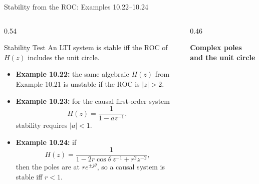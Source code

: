\begin{frame}[t]{Stability from the ROC: Examples 10.22--10.24}
  \footnotesize
  \begin{columns}[T]
    \begin{column}{0.54\textwidth}
      \begin{conceptbox}{Stability Test}
        An LTI system is stable iff the ROC of $H(z)$ includes the unit circle.
      \end{conceptbox}

      \begin{itemize}
        \item \textbf{Example 10.22:}
          the same algebraic $H(z)$ from Example 10.21 is unstable if the ROC is $|z|>2$.
        \item \textbf{Example 10.23:}
          for the causal first-order system
          \[
            H(z)=\frac{1}{1-az^{-1}},
          \]
          stability requires $|a|<1$.
        \item \textbf{Example 10.24:}
          if
          \[
            H(z)=\frac{1}{1-2r\cos\theta\, z^{-1}+r^2 z^{-2}},
          \]
          then the poles are at $re^{\pm j\theta}$, so a causal system is stable iff $r<1$.
      \end{itemize}
    \end{column}
    \begin{column}{0.46\textwidth}
      \begin{center}
        \textbf{Complex poles and the unit circle}\\[0.05cm]
\end{center}
\end{column}
\end{columns}
\end{frame}
